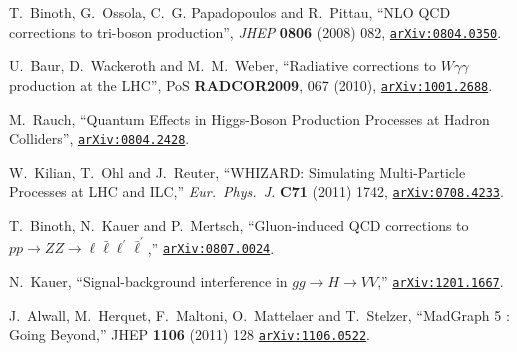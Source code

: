 \documentclass[english,12pt]{article}
\begin{document}
\begin{thebibliography}{10}
T.~Binoth, G.~Ossola, C.~G. Papadopoulos and R.~Pittau, ``{NLO QCD corrections
  to tri-boson production}'', {\em JHEP} {\bf 0806} (2008) 082,
\href{http://www.arXiv.org/abs/0804.0350}{{\tt arXiv:0804.0350}}.

  U.~Baur, D.~Wackeroth and M.~M.~Weber,
  ``{Radiative corrections to $W \gamma \gamma$ production at the LHC}'',
  PoS {\bf RADCOR2009}, 067 (2010),
\href{http://www.arXiv.org/abs/1001.2688}{{\tt arXiv:1001.2688}}.

  M.~Rauch,
  ``Quantum Effects in Higgs-Boson Production Processes at Hadron Colliders'',
 \href{http://arxiv.org/abs/0804.2428}{{\tt arXiv:0804.2428}}.

  W.~Kilian, T.~Ohl and J.~Reuter,
  ``WHIZARD: Simulating Multi-Particle Processes at LHC and ILC,''
  {\em Eur.\ Phys.\ J.} {\bf C71} (2011) 1742,
 \href{http://arxiv.org/abs/0708.4233}{{\tt arXiv:0708.4233}}.

  T.~Binoth, N.~Kauer and P.~Mertsch,
  ``Gluon-induced QCD corrections to $pp \rightarrow ZZ \rightarrow \ell \bar{\ell} \ell^{'} \bar{\ell}^{'}$,''
  \href{http://arXiv.org/abs/0807.0024}{{\tt arXiv:0807.0024}}.
  
  N.~Kauer,
  ``Signal-background interference in $gg \rightarrow H \rightarrow VV$,''
  \href{http://arXiv.org/abs/1201.1667} {{\tt arXiv:1201.1667}}.

  J.~Alwall, M.~Herquet, F.~Maltoni, O.~Mattelaer and T.~Stelzer,
  ``MadGraph 5 : Going Beyond,''
  JHEP {\bf 1106} (2011) 128
  \href{http://arXiv.org/abs/1106.0522}{\tt arXiv:1106.0522}.

\end{thebibliography}\endgroup
\end{document}

